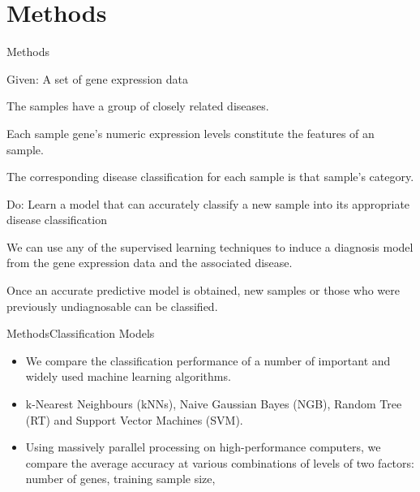 \documentclass[xcolor=table]{beamer}
\numberwithin{figure}{section}
\numberwithin{equation}{section}
\begin{document}
\section{Methods}

\begin{frame}{Methods}
\begin{exampleblock}{Given: A set of gene expression data}
\begin{itemize}\footnotesize{
    \item The samples have a group of closely related diseases. 
    \item Each sample gene's numeric expression levels constitute the features of an sample. 
    \item The corresponding disease classification for each sample is that sample's category. }
\end{itemize}
\end{exampleblock}

\begin{exampleblock}{Do: Learn a model that can accurately classify a new sample into its appropriate disease classification}
\begin{itemize}\footnotesize{
    \item We can use any of the supervised learning techniques to induce a diagnosis model from the gene expression data and the associated disease. 
    \item Once an accurate predictive model is obtained, new samples or those who were previously undiagnosable can be classified. }
\end{itemize}
\end{exampleblock}
\end{frame}

\begin{frame}{Methods}{Classification Models}
  \begin{itemize}
      \item We compare the classification performance of a number of important and widely used machine learning algorithms.
      \item  k-Nearest Neighbours (kNNs), Naive Gaussian Bayes (NGB), Random Tree (RT) and Support Vector Machines (SVM).
      \item Using massively parallel processing on high-performance computers, we compare the average accuracy at various combinations of levels of two factors: number of genes, training sample size, 
  \end{itemize}
\end{frame}
\end{document}
